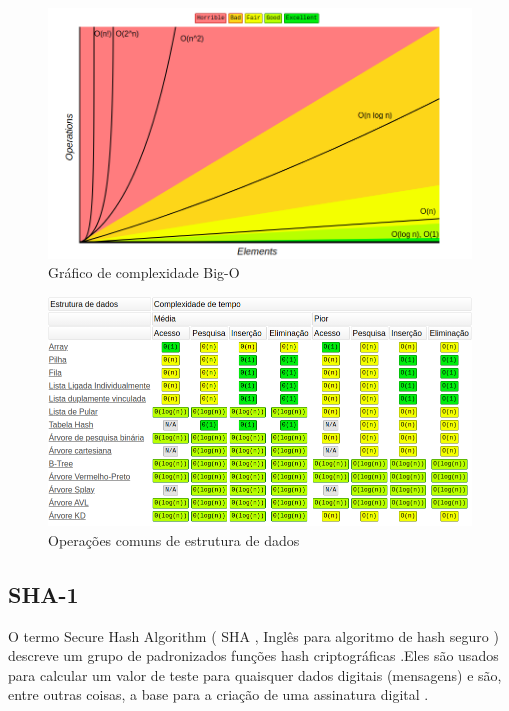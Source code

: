 \documentclass[a4paper, 12pt]{article}
\begin{document}
	\begin{center}
		\begin{figure}
			\centering
			\includegraphics[width=1\linewidth]{screenshot002}
			\caption[Gráfico de complexidade Big-O]{Gráfico de complexidade Big-O}
			\label{fig:screenshot002}
		\end{figure}
		\begin{figure}
			\centering
			\includegraphics[width=1\linewidth]{screenshot003}
			\caption[Operações comuns de estrutura de dados]{Operações comuns de estrutura de dados}
			\label{fig:screenshot003}
		\end{figure}
\end{center}
	\newpage

	\subsection{SHA-1}
O termo Secure Hash Algorithm ( SHA , Inglês para algoritmo de hash seguro ) descreve um grupo de padronizados funções hash criptográficas .Eles são usados para calcular um valor de teste para quaisquer dados digitais (mensagens) e são, entre outras coisas, a base para a criação de uma assinatura digital .
	
\end{document}
